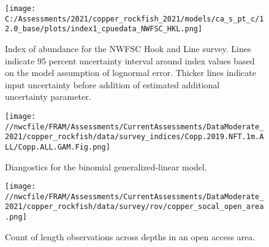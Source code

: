 \documentclass[11pt,
  english,
  a4paper,
]{article}
\begin{document}
\tagmcend\tagstructend


\begin{figure}
\centering
\texttt{[image: C:/Assessments/2021/copper\_rockfish\_2021/models/ca\_s\_pt\_c/12.0\_base/plots/index1\_cpuedata\_NWFSC\_HKL.png]}
\caption{Index of abundance for the NWFSC Hook and Line survey. Lines indicate 95 percent uncertainty interval around index values based on the model assumption of lognormal error. Thicker lines indicate input uncertainty before addition of estimated additional uncertainty parameter.\label{fig:hkl-index}}
\end{figure}

\tagmcend\tagstructend


\begin{figure}
\centering
\texttt{[image: //nwcfile/FRAM/Assessments/CurrentAssessments/DataModerate\_2021/copper\_rockfish/data/survey\_indices/Copp.2019.NFT.1m.ALL/Copp.ALL.GAM.Fig.png]}
\caption{Diangostics for the binomial generalized-linear model.\label{fig:hkl-diag}}
\end{figure}

\tagmcend\tagstructend


\begin{figure}
\centering
\texttt{[image: //nwcfile/FRAM/Assessments/CurrentAssessments/DataModerate\_2021/copper\_rockfish/data/survey/rov/copper\_socal\_open\_area.png]}
\caption{Count of length observations across depths in an open access area.\label{fig:rov-open}}
\end{figure}

\tagmcend\tagstructend

\end{document}
